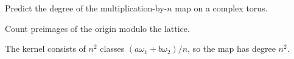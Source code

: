 \begin{exercise}\label{exr:iv30-expand-16}
Predict the degree of the multiplication-by-\(n\) map on a complex torus.
\end{exercise}
\begin{hint}
Count preimages of the origin modulo the lattice.
\end{hint}
\begin{solution}
The kernel consists of \(n^2\) classes \((a\omega_1+b\omega_2)/n\), so the map has degree \(n^2\).
\end{solution}

